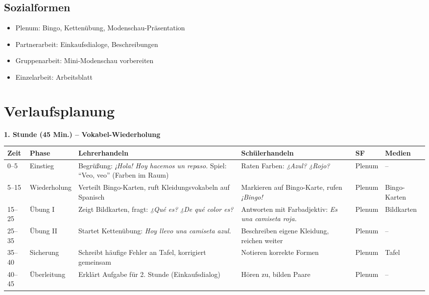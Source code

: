\documentclass[11pt,a4paper]{article}
\begin{document}
\subsection{Sozialformen}
\begin{itemize}
    \item Plenum: Bingo, Kettenübung, Modenschau-Präsentation
    \item Partnerarbeit: Einkaufsdialoge, Beschreibungen
    \item Gruppenarbeit: Mini-Modenschau vorbereiten
    \item Einzelarbeit: Arbeitsblatt
\end{itemize}

\section{Verlaufsplanung}

\textbf{1. Stunde (45 Min.) -- Vokabel-Wiederholung}

\begin{longtable}{|p{1cm}|p{1.5cm}|p{4cm}|p{3cm}|p{2cm}|p{2cm}|}
\hline
\textbf{Zeit} & \textbf{Phase} & \textbf{Lehrerhandeln} & \textbf{Schülerhandeln} & \textbf{SF} & \textbf{Medien} \\
\hline
\endhead

0--5 & Einstieg & Begrüßung: \textit{¡Hola! Hoy hacemos un repaso.} Spiel: ``Veo, veo'' (Farben im Raum) & Raten Farben: \textit{¿Azul? ¿Rojo?} & Plenum & -- \\
\hline

5--15 & Wieder\-holung & Verteilt Bingo-Karten, ruft Kleidungsvokabeln auf Spanisch & Markieren auf Bingo-Karte, rufen \textit{¡Bingo!} & Plenum & Bingo-Karten \\
\hline

15--25 & Übung I & Zeigt Bildkarten, fragt: \textit{¿Qué es? ¿De qué color es?} & Antworten mit Farbadjektiv: \textit{Es una camiseta roja.} & Plenum & Bildkarten \\
\hline

25--35 & Übung II & Startet Kettenübung: \textit{Hoy llevo una camiseta azul.} & Beschreiben eigene Kleidung, reichen weiter & Plenum & -- \\
\hline

35--40 & Sicherung & Schreibt häufige Fehler an Tafel, korrigiert gemeinsam & Notieren korrekte Formen & Plenum & Tafel \\
\hline

40--45 & Über\-leitung & Erklärt Aufgabe für 2. Stunde (Einkaufsdialog) & Hören zu, bilden Paare & Plenum & -- \\
\hline
\end{longtable}
\end{document}
